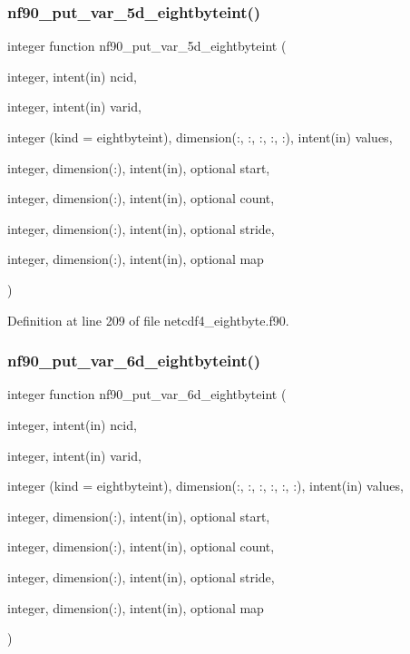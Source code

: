 \subsubsection{\texorpdfstring{nf90\+\_\+put\+\_\+var\+\_\+5d\+\_\+eightbyteint()}{nf90\_put\_var\_5d\_eightbyteint()}}
{\footnotesize\ttfamily integer function nf90\+\_\+put\+\_\+var\+\_\+5d\+\_\+eightbyteint (\begin{DoxyParamCaption}\item[{integer, intent(in)}]{ncid,  }\item[{integer, intent(in)}]{varid,  }\item[{integer (kind = eightbyteint), dimension(\+:, \+:, \+:, \+:, \+:), intent(in)}]{values,  }\item[{integer, dimension(\+:), intent(in), optional}]{start,  }\item[{integer, dimension(\+:), intent(in), optional}]{count,  }\item[{integer, dimension(\+:), intent(in), optional}]{stride,  }\item[{integer, dimension(\+:), intent(in), optional}]{map }\end{DoxyParamCaption})}



Definition at line 209 of file netcdf4\+\_\+eightbyte.\+f90.

\mbox{\label{netcdf4__eightbyte_8f90_a593864f2f5ed97b55185c8e459fc3760}} 
\subsubsection{\texorpdfstring{nf90\+\_\+put\+\_\+var\+\_\+6d\+\_\+eightbyteint()}{nf90\_put\_var\_6d\_eightbyteint()}}
{\footnotesize\ttfamily integer function nf90\+\_\+put\+\_\+var\+\_\+6d\+\_\+eightbyteint (\begin{DoxyParamCaption}\item[{integer, intent(in)}]{ncid,  }\item[{integer, intent(in)}]{varid,  }\item[{integer (kind = eightbyteint), dimension(\+:, \+:, \+:, \+:, \+:, \+:), intent(in)}]{values,  }\item[{integer, dimension(\+:), intent(in), optional}]{start,  }\item[{integer, dimension(\+:), intent(in), optional}]{count,  }\item[{integer, dimension(\+:), intent(in), optional}]{stride,  }\item[{integer, dimension(\+:), intent(in), optional}]{map }\end{DoxyParamCaption})}




